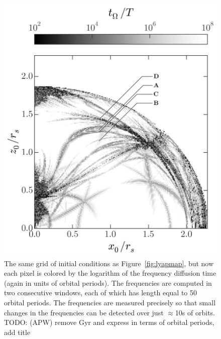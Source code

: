 \documentclass[letterpaper,12pt,preprint]{aastex}
\newcommand{\todo}[2]{{\color{red} TODO: (\MakeUppercase{#1}) #2}}
\begin{document}
\begin{figure}[p]
\begin{center}
\includegraphics[width=\textwidth]{figures/fdiff_map.png}
\caption{The same grid of initial conditions as Figure~\ref{fig:lyapmap}, but now each pixel is colored by the logarithm of the frequency diffusion time (again in units of orbital periods). The frequencies are computed in two consecutive windows, each of which has length equal to 50 orbital periods. The frequencies are measured precisely so that small changes in the frequencies can be detected over just $\approx$10s of orbits. \todo{apw}{remove Gyr and express in terms of orbital periods, add title} } \label{fig:freqdiff}
\end{center}
\end{figure}
\end{document}
